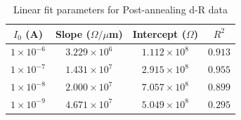 \begin{table}[h]
\centering
\caption{Linear fit parameters for Post-annealing d-R data}
\label{tab:post-linear-fits}
\begin{tabular}{|c|c|c|c|}
\hline
\textbf{$I_0$ (\si{\ampere})} & \textbf{Slope ($\Omega/\mu$m)} & \textbf{Intercept ($\Omega$)}  & \textbf{$R^{2}$} \\ \hline
$1\times10^{-6}$ & $3.229\times10^{6}$ & $1.112\times10^{8}$ & $0.913$ \\ \hline
$1\times10^{-7}$ & $1.431\times10^{7}$ & $2.915\times10^{8}$ & $0.955$ \\ \hline
$1\times10^{-8}$ & $2.000\times10^{7}$ & $7.057\times10^{8}$ & $0.899$ \\ \hline
$1\times10^{-9}$ & $4.671\times10^{7}$ & $5.049\times10^{8}$ & $0.295$ \\ \hline
\end{tabular}
\end{table}
